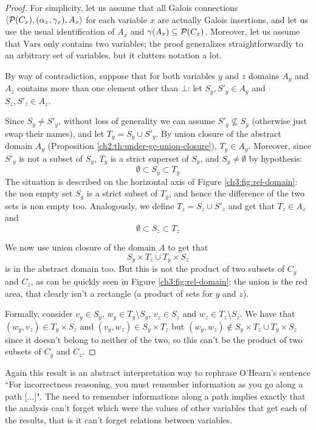 \begin{proof}
	For simplicity, let us assume that all Galois connections $\langle \mathcal{P}(C_x), (\alpha_x, \gamma_x), A_x \rangle$ for each variable $x$ are actually Galois insertions, and let us use the usual identification of $A_x$ and $\gamma(A_x) \subseteq \mathcal{P}(C_x)$.
	Moreover, let us assume that $\text{Vars}$ only contains two variables; the proof generalizes straightforwardly to an arbitrary set of variables, but it clutters notation a lot.

	By way of contradiction, suppose that for both variables $y$ and $z$ domains $A_y$ and $A_z$ contains more than one element other than $\bot$: let $S_y, S'_y \in A_y$ and $S_z, S'_z \in A_z$.

	Since $S_y \neq S'_y$, without loss of generality we can assume $S'_y \nsubseteq S_y$ (otherwise just swap their names), and let $T_y = S_y \cup S'_y$. By union closure of the abstract domain $A_y$ (Proposition \ref{ch2:th:under-gc-union-closure}), $T_y \in A_y$. Moreover, since $S'_y$ is not a subset of $S_y$, $T_y$ is a strict superset of $S_y$, and $S_y \neq \emptyset$ by hypothesis:
	\[
	\emptyset \subset S_y \subset T_y
	\]
	The situation is described on the horizontal axis of Figure \ref{ch3:fig:rel-domain}: the non empty set $S_y$ is a strict subset of $T_y$, and hence the difference of the two sets is non empty too.
	Analogously, we define $T_z = S_z \cup S'_z$ and get that $T_z \in A_z$ and
	\[
	\emptyset \subset S_z \subset T_z
	\]

	We now use union closure of the domain $A$ to get that
	\[
	S_y \times T_z \cup T_y \times S_z
	\]
	is in the abstract domain too. But this is not the product of two subsets of $C_y$ and $C_z$, as can be quickly seen in Figure \ref{ch3:fig:rel-domain}: the union is the red area, that clearly isn't a rectangle (a product of sets for $y$ and $z$).

	Formally, consider $v_y \in S_y$, $w_y \in T_y \setminus S_y$, $v_z \in S_z$ and $w_z \in T_z \setminus S_z$. We have that $(w_y, v_z) \in T_y \times S_z$ and $(v_y, w_z) \in S_y \times T_z$ but $(w_y, w_z) \notin S_y \times T_z \cup T_y \times S_z$ since it doesn't belong to neither of the two, so this can't be the product of two subsets of $C_y$ and $C_z$.
\end{proof}

Again this result is an abstract interpretation way to rephrase O'Hearn's sentence \cite{ohearn-incorrectness-logic} ``For incorrectness reasoning, you must remember information as you go along a path [...]".
The need to remember informations along a path implies exactly that the analysis can't forget which were the values of other variables that get each of the results, that is it can't forget relations between variables.

